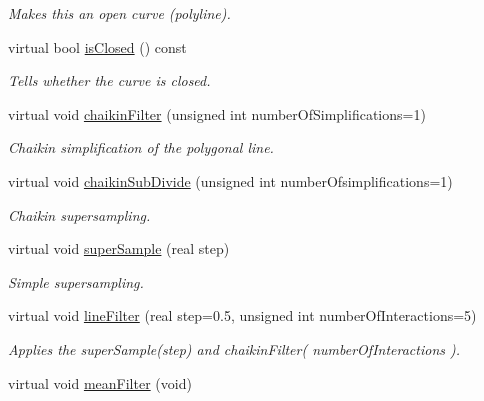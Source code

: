 \begin{DoxyCompactItemize}
\begin{DoxyCompactList}\small\item\em Makes this an open curve (polyline). \end{DoxyCompactList}\item 
virtual bool \hyperlink{classPolygonalCurve_a650308419f83ef5735817f89c7cd03e9}{isClosed} () const 
\begin{DoxyCompactList}\small\item\em Tells whether the curve is closed. \end{DoxyCompactList}\item 
virtual void \hyperlink{classPolygonalCurve_ac427edccc8fba8fd654bb33aeddb7683}{chaikinFilter} (unsigned int numberOfSimplifications=1)
\begin{DoxyCompactList}\small\item\em Chaikin simplification of the polygonal line. \end{DoxyCompactList}\item 
virtual void \hyperlink{classPolygonalCurve_abf2e97a0a0c961902fcf7e1419353796}{chaikinSubDivide} (unsigned int numberOfsimplifications=1)
\begin{DoxyCompactList}\small\item\em Chaikin supersampling. \end{DoxyCompactList}\item 
virtual void \hyperlink{classPolygonalCurve_aa9f93cdc3317da0e0d0ed4b4e0feca74}{superSample} (real step)
\begin{DoxyCompactList}\small\item\em Simple supersampling. \end{DoxyCompactList}\item 
virtual void \hyperlink{classPolygonalCurve_acc4ff1577900abc7c8c1f985fc4d192f}{lineFilter} (real step=0.5, unsigned int numberOfInteractions=5)
\begin{DoxyCompactList}\small\item\em Applies the superSample(step) and chaikinFilter( numberOfInteractions ). \end{DoxyCompactList}\item 
\hypertarget{classPolygonalCurve_af8148e418bf6df0da3261d0f2bbfc08e}{
virtual void \hyperlink{classPolygonalCurve_af8148e418bf6df0da3261d0f2bbfc08e}{meanFilter} (void)}
\label{classPolygonalCurve_af8148e418bf6df0da3261d0f2bbfc08e}


\end{DoxyCompactItemize}
